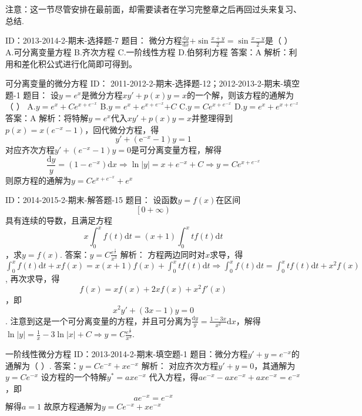 注意：这一节尽管安排在最前面，却需要读者在学习完整章之后再回过头来复习、总结.

ID：2013-2014-2-期末-选择题-7
题目：
微分方程$\frac{\text{d}y}{\text{d}x}\text{+}\sin \frac{x+y}{2}=\sin \frac{x-y}{2}$是（    ）
A.可分离变量方程
B.齐次方程
C.一阶线性方程
D.伯努利方程
答案：A
解析：利用和差化积公式进行化简即可得到。

可分离变量的微分方程
ID： 2011-2012-2-期末-选择题-12；2012-2013-2-期末-填空题-1
题目：
设$y={{e}^{x}}$是微分方程$x{y}'+p\left( x \right)y=x$的一个解，则该方程的通解为（    ）
A.$y={{e}^{x}}+C{{e}^{x+{{e}^{-x}}}}$
B.$y={{e}^{x}}+{{e}^{x+{{e}^{-x}}}}\text{+}C$
C.$y=C{{e}^{x+{{e}^{-x}}}}$
D.$y={{e}^{x}}+{{e}^{x+{{e}^{-x}}}}$
答案：A
解析：将特解$y={{e}^{x}}$代入$x{y}'+p\left( x \right)y=x$并整理得到$p\left( x \right)=x\left( {{e}^{-x}}-1 \right)$，回代微分方程，得
	\[{y}'+\left( {{\text{e}}^{-x}}-1 \right)y=1\] 
对应齐次方程${y}'+\left( {{e}^{-x}}-1 \right)y=0$是可分离变量方程，解得
	\[\frac{\text{d}y}{y}=\left( 1-{{e}^{-x}} \right)\text{d}x\Rightarrow \ln \left| y \right|=x+{{e}^{-x}}+C\Rightarrow y=C{{e}^{x+{{e}^{-x}}}}\] 
则原方程的通解为$y=C{{e}^{x+{{e}^{-x}}}}+{{e}^{x}}$ 

ID：2014-2015-2-期末-解答题-15
题目：
设函数$y=f\left( x \right)$在区间\[\left[ 0+\infty  \right)\]具有连续的导数，且满足方程\[x\int_{0}^{x}{f\left( t \right)\text{d}t}=\left( x+1 \right)\int_{0}^{x}{tf\left( t \right)\text{d}t}\]，求$y=f\left( x \right)$.
答案：$y=C\frac{{{e}^{\frac{1}{x}}}}{{{x}^{3}}}$
解析：
方程两边同时对$x$求导，得
	$\int_{0}^{x}{f\left( t \right)\text{d}t}+xf(x)=x\left( x+1 \right)f\left( x \right)+\int_{0}^{x}{tf\left( t \right)\text{d}t}\Rightarrow \int_{0}^{x}{f\left( t \right)\text{d}t}=\int_{0}^{x}{tf\left( t \right)\text{d}t}+{{x}^{2}}f\left( x \right)$,
再次求导，得\[f\left( x \right)=xf\left( x \right)+2xf\left( x \right)+{{x}^{2}}{f}'\left( x \right)\]，即\[{{x}^{2}}{y}'+\left( 3x-1 \right)y=0\]. 注意到这是一个可分离变量的方程，并且可分离为$\frac{\text{d}y}{y}=\frac{1-3x}{{{x}^{2}}}\text{d}x$，解得$\ln \left| y \right|=\frac{1}{x}-3\ln \left| x \right|+C\Rightarrow y=C\frac{{{e}^{\frac{1}{x}}}}{{{x}^{3}}}$.

一阶线性微分方程
ID：2013-2014-2-期末-填空题-1
题目：微分方程${y}'+y={{e}^{-x}}$的通解为（    ）.
答案：$y=C{{e}^{-x}}+x{{e}^{-x}}$
解析：
对应齐次方程${y}'+y=0$，其通解为$y=C{{e}^{-x}}$
设方程的一个特解${{y}^{*}}=ax{{e}^{-x}}$
代入方程，得$a{{e}^{-x}}-ax{{e}^{-x}}+ax{{e}^{-x}}={{e}^{-x}}$，即\[a{{e}^{-x}}={{e}^{-x}}\]
解得$a=1$
故原方程通解为$y=C{{e}^{-x}}+x{{e}^{-x}}$

